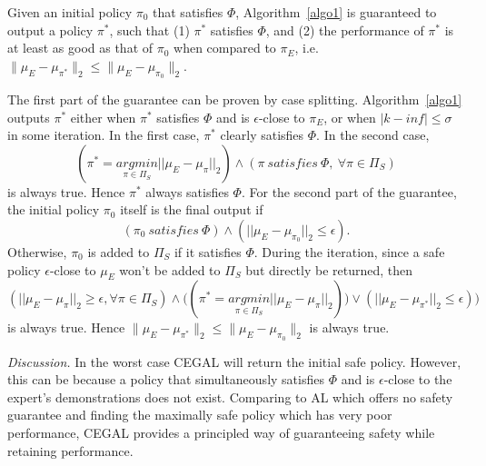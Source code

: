 \begin{theorem}
Given an initial policy $\pi_0$ that satisfies $\Phi$, Algorithm~\ref{algo1} is guaranteed to output a policy $\pi^*$, such that (1) $\pi^*$ satisfies $\Phi$, and 
(2) the performance of $\pi^*$ is at least as good as that of $\pi_0$ when compared to $\pi_E$, i.e. $\|\mu_E - \mu_{\pi^*}\|_2\leq\|\mu_E - \mu_{\pi_0}\|_2$. 
\end{theorem}
The first part of the guarantee can be proven by case splitting. Algorithm~\ref{algo1} outputs $\pi^*$ either when $\pi^*$ satisfies $\Phi$ and is {$\epsilon$-close} to $\pi_E$, or when $|k-inf|\leq \sigma$ in some iteration. 
In the first case, $\pi^*$ clearly satisfies $\Phi$. 
In the second case,  
\begin{equation}
(\pi^*=\underset{{\pi}\in\Pi_S}{argmin}||\mu_E - \mu_{{\pi}}||_2)\wedge(\pi\ satisfies\ \Phi,\ \forall\pi\in\Pi_S)
\end{equation}
is always true. Hence $\pi^*$ always satisfies $\Phi$. For the second part of the guarantee, the initial policy $\pi_0$ itself is the final output if
\begin{equation}
(\pi_0\ satisfies\ \Phi)\wedge(||\mu_E-\mu_{\pi_0}||_2\leq\epsilon). 
\end{equation}
Otherwise, $\pi_0$ is added to $\Pi_S$ if it satisfies $\Phi$.  
During the iteration, since a safe policy $\epsilon$-close to $\mu_E$ won't be added to $\Pi_S$ but directly be returned, then
\begin{equation}
(||\mu_E-\mu_{\pi}||_2\geq\epsilon, \forall\pi\in\Pi_S)\wedge\big((\pi^*=\underset{{\pi}\in\Pi_S}{argmin}||\mu_E - \mu_{{\pi}}||_2)\big)\vee(||\mu_E-\mu_{\pi^*}||_2\leq\epsilon)\big) 
\end{equation}
is always true. Hence $\|\mu_E -  \mu_{\pi^*}\|_2\leq\|\mu_E - \mu_{\pi_0}\|_2$ is always true. 
\noindent

{\it Discussion.} In the worst case CEGAL will return the initial safe policy. However, this can be because a policy that simultaneously satisfies $\Phi$ and is $\epsilon$-close to the expert's demonstrations does not exist. Comparing to AL which offers no safety guarantee and finding the maximally safe policy which has very poor performance, CEGAL provides a principled way of guaranteeing safety while retaining performance.

\noindent
